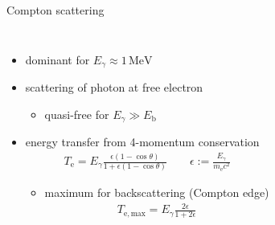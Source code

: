 \documentclass[11pt,xcolor=dvipsnames,professionalfonts]{beamer}
\begin{document}
\begin{frame}{Compton scattering}
\begin{columns}
	\begin{itemize}
		\setlength\itemsep{1.5em}
		\item dominant for $E_\gamma \approx 1 \, \mathrm{MeV}$
		
		\item scattering of photon at free electron
		\begin{itemize}
			\item quasi-free for $E_\gamma \gg E_\mathrm{b}$
		\end{itemize}
		
		\item energy transfer from 4-momentum conservation
		\begin{align*}
			T_\mathrm{e} = E_\gamma \frac{\epsilon (1 - \cos\theta)}{1 + \epsilon (1 - \cos\theta)} \qquad \epsilon := \frac{E_\gamma}{m_\mathrm{e}c^2}
		\end{align*}
		\begin{itemize}
			\item maximum for backscattering (Compton edge)
			\begin{align*}
				T_\mathrm{e, max} = E_\gamma \frac{2\epsilon}{1+ 2\epsilon}
			\end{align*}
		\end{itemize}
		
	\end{itemize}
	

\end{columns}
\end{frame}
\end{document}
